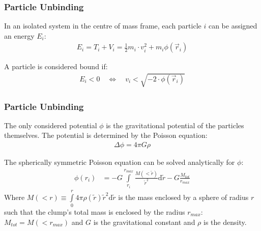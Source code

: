 \begin{frame}
	\frametitle{Particle Unbinding}
	
%	
%	

	In an isolated system in the centre of mass frame, each particle $i$ can be assigned an energy $E_i$:
	\begin{align*}
	E_i = T_i + V_i = \frac{1}{2} m_i \cdot v^2_i + m_i \phi (\vec{r}_i)
	\end{align*}
	
	A particle is considered bound if:
	\begin{align*}
	E_i < 0 \quad \Leftrightarrow \quad v_i < \sqrt{- 2 \cdot \phi(\vec{r}_i)}
	\end{align*}
	
\end{frame}










\begin{frame}
	\frametitle{Particle Unbinding}
	The only considered potential $\phi$ is the gravitational potential of the particles themselves. The potential is determined by the Poisson equation:
	\begin{align*}
		\Delta \phi = 4 \pi G \rho
	\end{align*}
	
	The spherically symmetric Poisson equation  can be solved analytically for $\phi$:
	\begin{align*}
	\phi (r_i) &=  - G \int\limits_{r_i}^{r_{max}} \frac{M(<\tilde{r})}{\tilde{r}^2} \mathrm{d}\tilde{r}
	- G  \frac{M_{tot}}{r_{max}}
	\end{align*}
	Where $M(<r) \equiv \int\limits_0^r 4 \pi \rho(\tilde{r})\tilde{r}^2 \mathrm{d}\tilde{r} $ is the mass enclosed by a sphere of radius $r$ such that the clump's total mass is enclosed by the radius $r_{max}$: $M_{tot} = M(<r_{max})$ and $G$ is the gravitational constant and $\rho$ is the density.
\end{frame}




